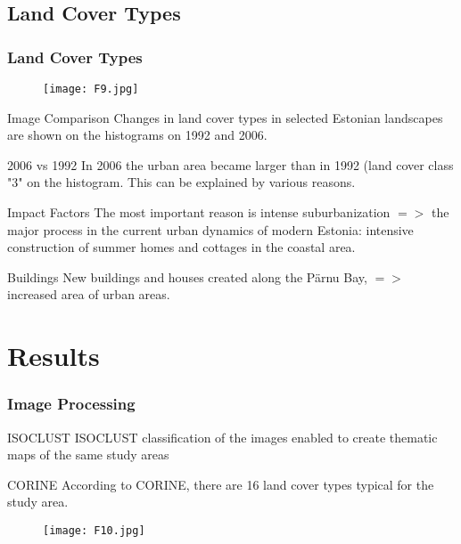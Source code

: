\documentclass[pdflatex,compress,8pt,
	xcolor={dvipsnames,dvipsnames,svgnames,x11names,table},
	hyperref={	
	breaklinks = true, 
	pdfauthor={Lemenkova Polina}, 
	pdfsubject={Preentation}, 
	pdfcreator={Lemenkova Polina}, 
	pdfproducer={Lemenkova Polina}, 
	colorlinks=true,
	linkcolor=Tomato, 
	citecolor=DeepPink3, 
	urlcolor = NavyBlue, 
	breaklinks = true}]{beamer}
\begin{document}
\subsection{Land Cover Types}
	\begin{frame}\frametitle{Land Cover Types}
	\vspace{3em}	
	\begin{figure}[H]
		\centering
			\texttt{[image: F9.jpg]}
	\end{figure}
	
	\begin{block}{Image Comparison}
Changes in land cover types in selected Estonian landscapes are shown on the histograms on 1992 and 2006.
	\end{block}

	\begin{block}{2006 vs 1992}
 In 2006 the urban area became larger than in 1992 (land cover class "3" on the histogram. This can be explained by various reasons.
	\end{block}

	\begin{block}{Impact Factors}
The most important reason is intense suburbanization $=>$ the major process in the current urban dynamics of modern Estonia: intensive construction of summer homes and cottages in the coastal area.
	\end{block}

	\begin{block}{Buildings}
New buildings and houses created along the P\"{a}rnu Bay, $=>$ increased area of urban areas.
	\end{block}
\end{frame}

\section{Results}
\begin{frame}\frametitle{Image Processing}

	\begin{block}{ISOCLUST}
ISOCLUST classification of the images enabled to create thematic maps of the same study areas
	\end{block}

	\begin{block}{CORINE}
According to CORINE, there are 16 land cover types typical for the study area.
	\end{block}

	\begin{figure}[H]
		\centering
			\texttt{[image: F10.jpg]}
	\end{figure}
\end{frame}
\end{document}
